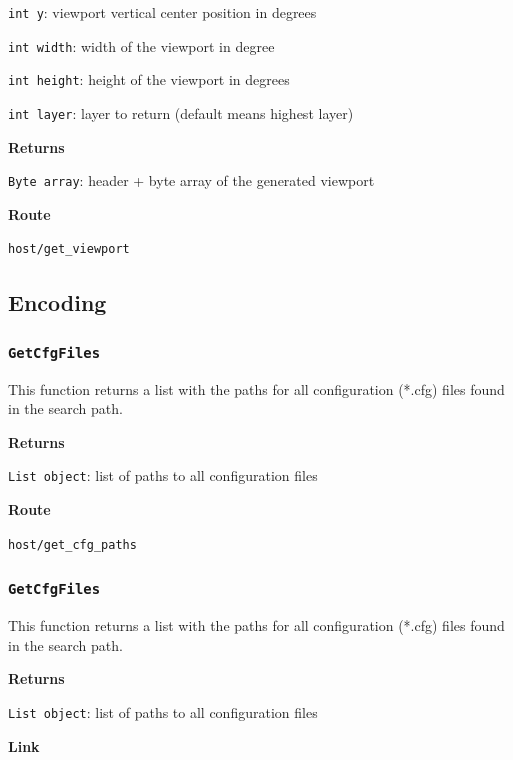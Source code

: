 \documentclass{article}
\begin{document}
\texttt{int y}: viewport vertical center position in degrees

\texttt{int width}: width of the viewport in degree

\texttt{int height}: height of the viewport in degrees

\texttt{int layer}: layer to return (default means highest layer)

\textbf{Returns}

\texttt{Byte array}: header + byte array of the generated viewport

\textbf{Route}

\texttt{host/get_viewport}





\subsection{Encoding}

\subsubsection*{\texttt{GetCfgFiles}}

This function returns a list with the paths for all configuration (*.cfg) files found in the search path.

\textbf{Returns}

\texttt{List object}: list of paths to all configuration files

\textbf{Route}

\texttt{host/get_cfg_paths}


\subsubsection*{\texttt{GetCfgFiles}}

This function returns a list with the paths for all configuration (*.cfg) files found in the search path.

\textbf{Returns}

\texttt{List object}: list of paths to all configuration files

\textbf{Link}
\end{document}
